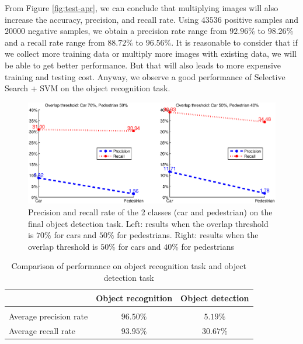 \documentclass{article} %
\begin{document}
From Figure \ref{fig:test-apr}, we can conclude that multiplying images will also increase the accuracy, precision, and recall rate. Using $43536$ positive samples and $20000$ negative samples, we obtain a precision rate range from $92.96\%$ to $98.26\%$ and a recall rate range from $88.72\%$ to $96.56\%$. It is reasonable to consider that if we collect more training data or multiply more images with existing data, we will be able to get better performance. But that will also leads to more expensive training and testing cost. Anyway, we observe a good performance of Selective Search + SVM on the object recognition task.

\begin{figure}[htb]
\begin{center}
\includegraphics[width=\textwidth]{test-result.eps}
\end{center}
\caption{Precision and recall rate of the 2 classes (car and pedestrian) on the final object detection task. Left: results when the overlap threshold is $70\%$ for cars and $50\%$ for pedestrians. Right: results when the overlap threshold is $50\%$ for cars and $40\%$ for pedestrians
\label{fig:test-result}}
\end{figure}

\begin{table}[htb]
\caption{Comparison of performance on object recognition task and object detection task}
\label{tab:comp}
\begin{center}
\begin{tabular}{lcc}
\multicolumn{1}{c}{} &\multicolumn{1}{c}{\bf Object recognition}  &\multicolumn{1}{c}{\bf Object detection}
\\ \hline \\
Average precision rate & $96.50\%$ & $5.19\%$ \\
Average recall rate    & $93.95\%$ & $30.67\%$ \\
\end{tabular}
\end{center}
\end{table}
\end{document}
